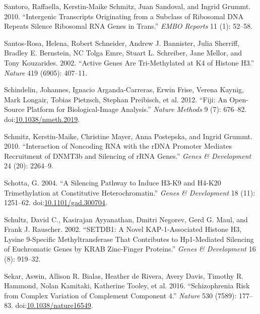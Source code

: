 \documentclass[onehalf,12pt]{beavtex}
\begin{document}
  \hypertarget{ref-SantoroIntergenictranscriptsoriginating2010}{}
  Santoro, Raffaella, Kerstin-Maike Schmitz, Juan Sandoval, and Ingrid
  Grummt. 2010. ``Intergenic Transcripts Originating from a Subclass of
  Ribosomal DNA Repeats Silence Ribosomal RNA Genes in Trans.'' \emph{EMBO
  Reports} 11 (1): 52--58.
  
  \hypertarget{ref-Santos-RosaActivegenesare2002}{}
  Santos-Rosa, Helena, Robert Schneider, Andrew J. Bannister, Julia
  Sherriff, Bradley E. Bernstein, NC Tolga Emre, Stuart L. Schreiber, Jane
  Mellor, and Tony Kouzarides. 2002. ``Active Genes Are Tri-Methylated at
  K4 of Histone H3.'' \emph{Nature} 419 (6905): 407--11.
  
  \hypertarget{ref-SchindelinFijiopensourceplatform2012}{}
  Schindelin, Johannes, Ignacio Arganda-Carreras, Erwin Frise, Verena
  Kaynig, Mark Longair, Tobias Pietzsch, Stephan Preibisch, et al. 2012.
  ``Fiji: An Open-Source Platform for Biological-Image Analysis.''
  \emph{Nature Methods} 9 (7): 676--82.
  doi:\href{https://doi.org/10.1038/nmeth.2019}{10.1038/nmeth.2019}.
  
  \hypertarget{ref-SchmitzInteractionnoncodingRNA2010}{}
  Schmitz, Kerstin-Maike, Christine Mayer, Anna Postepska, and Ingrid
  Grummt. 2010. ``Interaction of Noncoding RNA with the rDNA Promoter
  Mediates Recruitment of DNMT3b and Silencing of rRNA Genes.''
  \emph{Genes \& Development} 24 (20): 2264--9.
  
  \hypertarget{ref-Schottasilencingpathwayinduce2004}{}
  Schotta, G. 2004. ``A Silencing Pathway to Induce H3-K9 and H4-K20
  Trimethylation at Constitutive Heterochromatin.'' \emph{Genes \&
  Development} 18 (11): 1251--62.
  doi:\href{https://doi.org/10.1101/gad.300704}{10.1101/gad.300704}.
  
  \hypertarget{ref-SchultzSETDB1novelKAP1associated2002a}{}
  Schultz, David C., Kasirajan Ayyanathan, Dmitri Negorev, Gerd G. Maul,
  and Frank J. Rauscher. 2002. ``SETDB1: A Novel KAP-1-Associated Histone
  H3, Lysine 9-Specific Methyltransferase That Contributes to Hp1-Mediated
  Silencing of Euchromatic Genes by KRAB Zinc-Finger Proteins.''
  \emph{Genes \& Development} 16 (8): 919--32.
  
  \hypertarget{ref-SekarSchizophreniariskcomplex2016}{}
  Sekar, Aswin, Allison R. Bialas, Heather de Rivera, Avery Davis, Timothy
  R. Hammond, Nolan Kamitaki, Katherine Tooley, et al. 2016.
  ``Schizophrenia Risk from Complex Variation of Complement Component 4.''
  \emph{Nature} 530 (7589): 177--83.
  doi:\href{https://doi.org/10.1038/nature16549}{10.1038/nature16549}.
  
\end{document}
